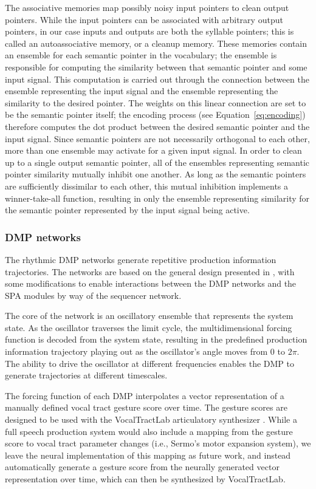 The associative memories
map possibly noisy input pointers
to clean output pointers.
While the input pointers
can be associated with arbitrary
output pointers,
in our case inputs and outputs
are both the syllable pointers;
this is called an autoassociative memory,
or a cleanup memory.
These memories contain an ensemble
for each semantic pointer
in the vocabulary;
the ensemble is responsible for computing
the similarity between
that semantic pointer
and some input signal.
This computation is carried out
through the connection between
the ensemble representing the input signal
and the ensemble representing
the similarity to the desired pointer.
The weights on this linear connection
are set to be the semantic pointer itself;
the encoding process (see Equation~\eqref{eq:encoding})
therefore computes the dot product
between the desired semantic pointer
and the input signal.
Since semantic pointers are not necessarily
orthogonal to each other,
more than one ensemble may activate
for a given input signal.
In order to clean up to a single
output semantic pointer,
all of the ensembles
representing semantic pointer similarity
mutually inhibit one another.
As long as the semantic pointers
are sufficiently dissimilar
to each other,
this mutual inhibition
implements a winner-take-all function,
resulting in only the ensemble
representing similarity for the
semantic pointer represented by
the input signal being active.

\subsubsection{DMP networks}
\label{sec:impl-dmp}

The rhythmic DMP networks
generate repetitive
production information trajectories.
The networks are based on
the general design
presented in \cite{dewolf2014},
with some modifications
to enable interactions between
the DMP networks
and the SPA modules
by way of the sequencer network.

The core of the network
is an oscillatory ensemble
that represents the system state.
As the oscillator traverses
the limit cycle,
the multidimensional forcing function
is decoded from the system state,
resulting in the predefined
production information trajectory
playing out as
the oscillator's angle moves from $0$ to $2\pi$.
The ability to drive the oscillator
at different frequencies
enables the DMP to generate trajectories
at different timescales.

The forcing function of each DMP
interpolates a vector representation of
a manually defined
vocal tract gesture score over time.
The gesture scores are
designed to be used with the VocalTractLab
articulatory synthesizer
\cite{birkholz2006,birkholz2013}.
While a full speech production system
would also include a mapping from
the gesture score to
vocal tract parameter changes
(i.e., Sermo's motor expansion system),
we leave the neural implementation
of this mapping as future work,
and instead automatically generate
a gesture score from the neurally generated
vector representation over time,
which can then be synthesized
by VocalTractLab.

